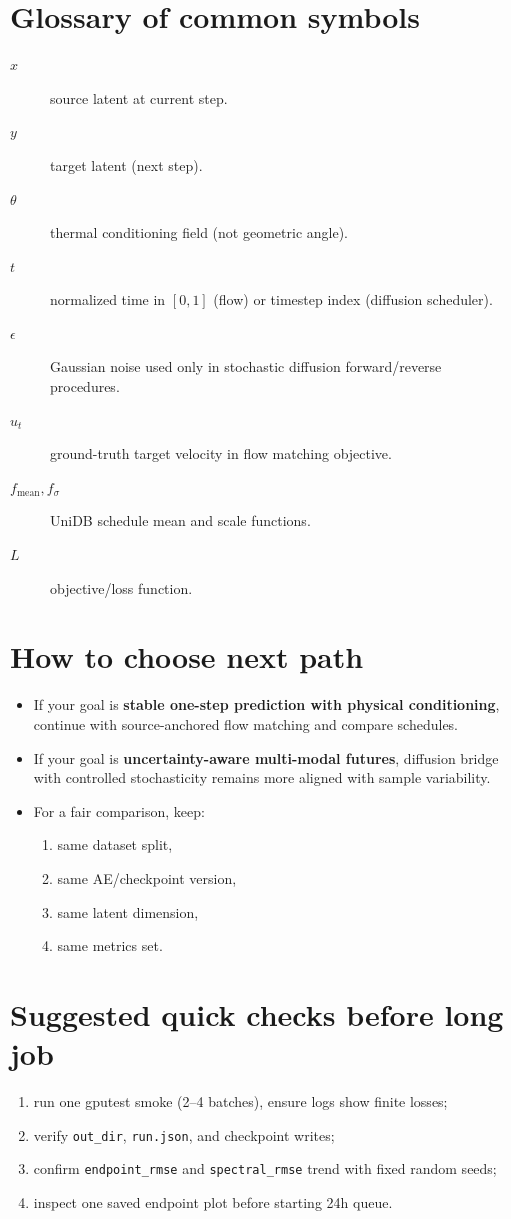 \documentclass[11pt]{article}
\begin{document}
\section{Glossary of common symbols}
\begin{description}
  \item[\(x\)] source latent at current step.
  \item[\(y\)] target latent (next step).
  \item[\(\theta\)] thermal conditioning field (not geometric angle).
  \item[\(t\)] normalized time in \([0,1]\) (flow) or timestep index (diffusion scheduler).
  \item[\(\epsilon\)] Gaussian noise used only in stochastic diffusion forward/reverse procedures.
  \item[\(u_t\)] ground-truth target velocity in flow matching objective.
  \item[\(f_{\text{mean}}, f_\sigma\)] UniDB schedule mean and scale functions.
  \item[\(L\)] objective/loss function.
\end{description}

\section{How to choose next path}
\begin{itemize}
  \item If your goal is \textbf{stable one-step prediction with physical conditioning}, continue with source-anchored flow matching and compare schedules.
  \item If your goal is \textbf{uncertainty-aware multi-modal futures}, diffusion bridge with controlled stochasticity remains more aligned with sample variability.
  \item For a fair comparison, keep:
  \begin{enumerate}
    \item same dataset split,
    \item same AE/checkpoint version,
    \item same latent dimension,
    \item same metrics set.
  \end{enumerate}
\end{itemize}

\section{Suggested quick checks before long job}
\begin{enumerate}
  \item run one gputest smoke (2--4 batches), ensure logs show finite losses;
  \item verify \texttt{out\_dir}, \texttt{run.json}, and checkpoint writes;
  \item confirm \texttt{endpoint\_rmse} and \texttt{spectral\_rmse} trend with fixed random seeds;
  \item inspect one saved endpoint plot before starting 24h queue.
\end{enumerate}
\end{document}
